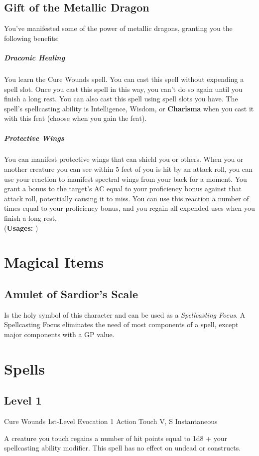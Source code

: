 \documentclass[letterpaper,openany,oneside,twocolumn]{book}
\begin{document}
\subsection*{Gift of the Metallic Dragon}
You've manifested some of the power of metallic dragons, granting you the following benefits:
\subparagraph*{Draconic Healing}
You learn the Cure Wounds spell. You can cast this spell without expending a spell slot. Once you cast this spell in this way, you can't do so again until you finish a long rest. You can also cast this spell using spell slots you have. The spell's spellcasting ability is Intelligence, Wisdom, or \textbf{Charisma} when you cast it with this feat (choose when you gain the feat).
\subparagraph*{Protective Wings}
You can manifest protective wings that can shield you or others. When you or another creature you can see within 5 feet of you is hit by an attack roll, you can use your reaction to manifest spectral wings from your back for a moment. You grant a bonus to the target's AC equal to your proficiency bonus against that attack roll, potentially causing it to miss. You can use this reaction a number of times equal to your proficiency bonus, and you regain all expended uses when you finish a long rest.\\
(\textbf{Usages: })

\section*{Magical Items}
\subsection*{Amulet of Sardior's Scale}
Is the holy symbol of this character and can be used as a \textit{Spellcasting Focus}. A Spellcasting Focus eliminates the need of most components of a spell, except major components with a GP value.

\section*{Spells}
\subsection*{Level 1}

\DndSpellHeader
  {Cure Wounds}
  {1st-Level Evocation}
  {1 Action}
  {Touch}
  {V, S}
  {Instantaneous}

A creature you touch regains a number of hit points equal to 1d8 + your spellcasting ability modifier. This spell has no effect on undead or constructs.
\end{document}
